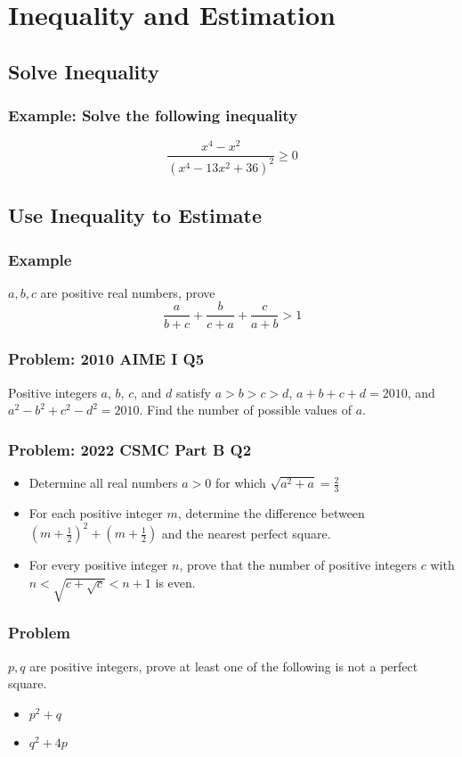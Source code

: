 \documentclass{article}
\begin{document}
\section{Inequality and Estimation}

\subsection{Solve Inequality}

\subsubsection{Example: Solve the following inequality}
$$\frac{x^4-x^2}{(x^4-13x^2+36)^2} \ge 0$$
\vspace{60px}

\subsection{Use Inequality to Estimate}
\subsubsection{Example}
$a,b,c$ are positive real numbers, prove
$$\frac{a}{b+c}+\frac{b}{c+a}+\frac{c}{a+b} > 1$$
\vspace{60px}

\subsubsection{Problem: 2010 AIME I Q5}
Positive integers $a$, $b$, $c$, and $d$ satisfy $a > b > c > d$, $a + b + c + d = 2010$, and $a^2 - b^2 + c^2 - d^2 = 2010$. Find the number of possible values of $a$.
\vspace{60px}

\pagebreak

\subsubsection{Problem: 2022 CSMC Part B Q2}

\begin{itemize}
    \item  Determine all real numbers $a > 0$ for which $\sqrt{a^2+a}=\frac{2}{3}$
    \item  For each positive integer $m$, determine the difference between $(m+\frac{1}{2})^2+(m+\frac{1}{2})$ and the nearest perfect square.
    \item  For every positive integer $n$, prove that the number of positive integers $c$ with $n<\sqrt{c+\sqrt{c}}<n+1$ is even.
\end{itemize}

\pagebreak
\subsubsection{Problem}
$p, q$ are positive integers, prove at least one of the following is not a perfect square.
\begin{itemize}
    \item $p^2+q$
    \item $q^2+4p$
\end{itemize}
\end{document}
